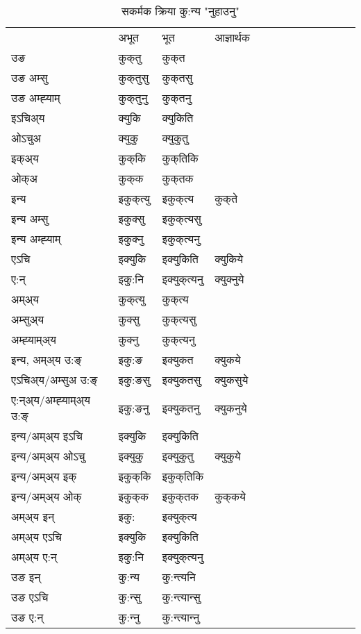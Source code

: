 \begin{table}[H]
\label{ukt.vt} \centering
\caption{सकर्मक क्रिया  कु:न्य  "नुहाउनु"  }
\begin{tabular}{l|l|l|l|l|l|l|l|l|l|l|l|l}  \toprule
&अभूत & भूत & आज्ञार्थक \\ 
उङ &कुक्‌तु &कुक्‌त \\ 
उङ अम्सु&कुक्‌तुसु &कुक्‌तसु \\ 
उङ अम्ह्‍याम्&कुक्‌तुनु &कुक्‌तनु \\ 
इऽचिअ्य &क्युकि &क्युकिति   \\ 
ओऽचुअ        &क्युकु &क्युकुतु   \\ 
इक्अ्य&कुक्‌कि &कुक्‌तिकि   \\ 
ओक्अ &कुक्‌क &कुक्‌तक   \\ 
इन्य & इकुक्‌त्यु  & इकुक्‌त्य &कुक्‌ते  \\ 
इन्य अम्सु& इकुक्सु  & इकुक्‌त्यसु   \\ 
इन्य अम्ह्‍याम्& इकुक्‍नु  & इकुक्‌त्यनु   \\ 
एऽचि & इक्युकि & इक्युकिति &क्युकिये    \\ 
ए:न् & इकु:नि  & इक्युक्‌त्यनु &क्युक्‍नुये  \\ 
अम्अ्य & कुक्‌त्यु  & कुक्‌त्य  \\ 
अम्सुअ्य & कुक्सु & कुक्‌त्यसु  \\ 
अम्ह्‍याम्अ्य & कुक्‍नु  & कुक्‌त्यनु \\ 
\midrule
इन्य, अम्अ्य उ:ङ्‌ &इकु:ङ &इक्युकत &क्युकये \\ 
एऽचिअ्य/अम्सुअ उ:ङ्‌ &इकु:ङसु &इक्युकतसु &क्युकसुये \\ 
ए:न्अ्य/अम्ह्‍याम्अ्य उ:ङ्‌ &इकु:ङनु &इक्युकतनु &क्युकनुये \\ 
इन्य/अम्अ्य इऽचि &इक्युकि &इक्युकिति    \\ 
इन्य/अम्अ्य ओऽचु &इक्युकु &इक्युकुतु  &क्युकुये  \\ 
इन्य/अम्अ्य इक् &इकुक्‌कि &इकुक्‌तिकि   \\ 
इन्य/अम्अ्य ओक् &इकुक्‌क &इकुक्‌तक  &कुक्‌कये  \\ 
अम्अ्य इन् & इकु: & इक्युक्‌त्य   \\ 
अम्अ्य एऽचि & इक्युकि & इक्युकिति    \\ 
अम्अ्य ए:न् & इकु:नि  & इक्युक्‌त्यनु  \\ 
\midrule
उङ इन् & कु:न्य  & कु:न्त्यनि  \\ 
उङ एऽचि & कु:न्सु  & कु:न्त्यान्सु   \\ 
उङ ए:न्& कु:न्‍नु  & कु:न्त्यान्‍नु   \\ 
\bottomrule
\end{tabular}
\end{table}


